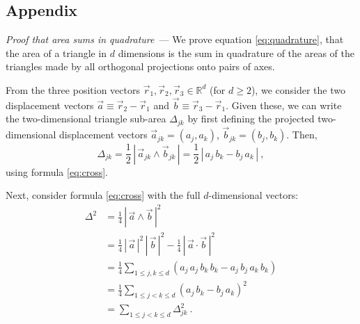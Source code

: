 \documentclass[10pt]{article}
\renewcommand{\paragraph}[1]{\par\addvspace{1em}\noindent\textsl{#1}~---}
\newcommand{\secbreak}{\bigskip{\centering\footnotesize $\triangle~~~\triangle~~~\triangle$\par}\bigskip\noindent}
\newcommand{\abs}[1]{|\,{#1}\,|}
\begin{document}
\secbreak

\vspace{-\bigskipamount}
\renewcommand{\section}[2]{}%
{\small\singlespacing\par}

\secbreak
\appendix
\subsection{Appendix}
\label{sec:appendix}

\paragraph{Proof that area sums in quadrature} We prove equation \eqref{eq:quadrature}, that the area of a triangle in $d$ dimensions is the sum in quadrature of the areas of the triangles made by all orthogonal projections onto pairs of axes.

From the three position vectors $\vec{r}_1, \vec{r}_2, \vec{r}_3 \in \mathbb{R}^d$ (for $d \geq 2$), we consider the two displacement vectors $\vec{a} \equiv \vec{r}_2 - \vec{r}_1$ and $\vec{b} \equiv \vec{r}_3 - \vec{r}_1$.
Given these, we can write the two-dimensional triangle sub-area $\Delta_{jk}$ by first defining the projected two-dimensional displacement vectors $\vec{a}_{jk} = ( a_j, a_k )$, $\vec{b}_{jk} = ( b_j, b_k )$. Then,
\begin{equation}
    \Delta_{jk}
    = \frac{1}{2} \, \abs{ \vec{a}_{jk} \wedge \vec{b}_{jk} }
    = \frac{1}{2}
        \, \abs{a_j \, b_k - b_j \, a_k}~,
\end{equation}
using formula \eqref{eq:cross}.

Next, consider formula \eqref{eq:cross} with the full $d$-dimensional vectors:
\begin{align}
    \Delta^2
    &= \frac{1}{4}\, \abs{\vec{a} \wedge \vec{b}}^2 \nonumber\\
    &= \frac{1}{4}\, \abs{\vec{a}}^2 \, \abs{\vec{b}}^2 - \frac{1}{4}\, \abs{\vec{a} \cdot \vec{b}}^2 \nonumber\\
    &= \frac{1}{4} \sum_{1 \leq j, k \leq d}
        ( a_j \, a_j \, b_k \, b_k - a_j \, b_j \, a_k \, b_k ) \nonumber\\
    &= \frac{1}{4} \sum_{1 \leq j < k \leq d}
        ( a_j \, b_k - b_j \, a_k )^2 \nonumber\\
    &= \sum_{1 \leq j < k \leq d} \Delta_{jk}^2~.
\end{align}
\end{document}
